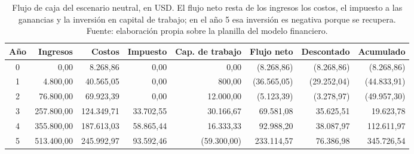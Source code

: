 \begin{table}[t]
  \centering
  \footnotesize\setlength{\tabcolsep}{3.5pt}
  \caption{Flujo de caja del escenario neutral, en USD. El flujo neto resta de los ingresos los costos, el impuesto a las ganancias y la inversión en capital de trabajo; en el año 5 esa inversión es negativa porque se recupera. Fuente: elaboración propia sobre la planilla del modelo financiero.}
  \label{tab:financiero-neutral-flujo}
  \begin{tabular}{c r r r r r r r}
    \hline
    \textbf{Año} & \textbf{Ingresos} & \textbf{Costos} & \textbf{Impuesto} & \textbf{Cap. de trabajo} & \textbf{Flujo neto} & \textbf{Descontado} & \textbf{Acumulado} \\
    \hline
    0 & 0,00 & 8.268,86 & 0,00 & 0,00 & (8.268,86) & (8.268,86) & (8.268,86) \\
    1 & 4.800,00 & 40.565,05 & 0,00 & 800,00 & (36.565,05) & (29.252,04) & (44.833,91) \\
    2 & 76.800,00 & 69.923,39 & 0,00 & 12.000,00 & (5.123,39) & (3.278,97) & (49.957,30) \\
    3 & 257.800,00 & 124.349,71 & 33.702,55 & 30.166,67 & 69.581,08 & 35.625,51 & 19.623,78 \\
    4 & 355.800,00 & 187.613,03 & 58.865,44 & 16.333,33 & 92.988,20 & 38.087,97 & 112.611,97 \\
    5 & 513.400,00 & 245.992,97 & 93.592,46 & (59.300,00) & 233.114,57 & 76.386,98 & 345.726,54 \\
    \hline
  \end{tabular}
\end{table}
